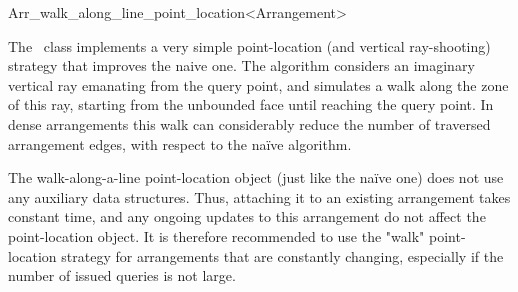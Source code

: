 
\ccRefPageBegin

\begin{ccRefClass}{Arr_walk_along_line_point_location<Arrangement>}
\label{arr_ref:walk_pl}

\ccDefinition

The \ccRefName\ class implements a very simple point-location (and 
vertical ray-shooting) strategy that improves the naive one.
The algorithm considers an imaginary vertical ray emanating from the
query point, and simulates a walk along the zone of this ray, starting
from the unbounded face until reaching the query point.
In dense arrangements this walk can considerably reduce the number
of traversed arrangement edges, with respect to the na\"{i}ve
algorithm.

The walk-along-a-line point-location object (just like the na\"{i}ve one)
does not use any auxiliary data structures. Thus, attaching it to an
existing arrangement takes constant time, and any ongoing updates to
this arrangement do not affect the point-location object.
It is therefore recommended to use the "walk" point-location strategy
for arrangements that are constantly changing, especially if the number
of issued queries is not large.


\ccIsModel
   \\

\end{ccRefClass}

\ccRefPageEnd
